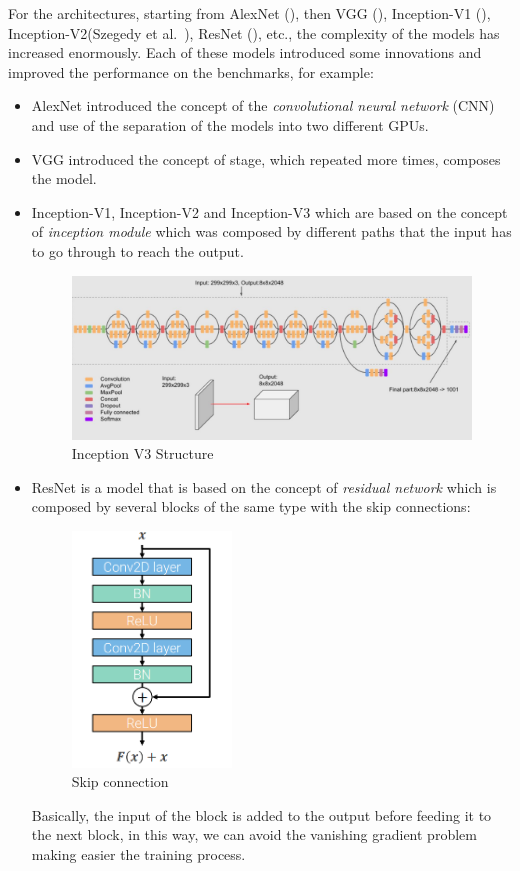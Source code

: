 For the architectures, starting from AlexNet (\cite{alex_net_paper}), then VGG (\cite{vgg_paper}), Inception-V1 (\cite{inception_v1_paper}), Inception-V2(Szegedy et al.~\cite{inception_v2_paper}), ResNet (\cite{resnet_paper}), etc., the complexity of the models has increased enormously.
Each of these models introduced some innovations and improved the performance on the benchmarks, for example:
\begin{itemize}
    \item AlexNet introduced the concept of the \emph{convolutional neural network} (CNN) and use of the separation of the models into two different GPUs.
    \item VGG introduced the concept of stage, which repeated more times, composes the model.
    \item Inception-V1, Inception-V2 and Inception-V3 which are based on the concept of \emph{inception module} which was composed by different paths that the input has to go through to reach the output.
    \begin{figure}[H]
        \centering
        \includegraphics[width=\textwidth]{images/2_inception_v3}
        \caption{Inception V3 Structure}\label{fig:inception-v3}
    \end{figure}
    \item ResNet is a model that is based on the concept of \emph{residual network} which is composed by several blocks of the same type with the skip connections:
    \begin{figure}[H]
        \centering
        \includegraphics[width=0.4\textwidth]{images/2_1_skip_connection}
        \caption{Skip connection}\label{fig:skip-connection}
    \end{figure}
    Basically, the input of the block is added to the output before feeding it to the next block, in this way, we can avoid the \gls{vanishing gradient problem} making easier the training process.
\end{itemize}
